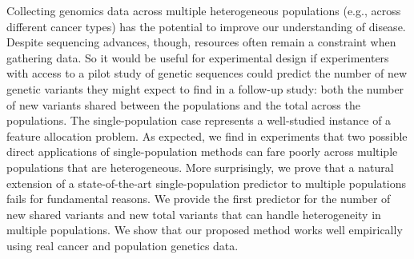 Collecting genomics data across multiple heterogeneous populations (e.g., across different cancer types) has the potential to improve our understanding of disease. Despite sequencing advances, though, resources often remain a constraint when gathering data. So it would be useful for experimental design if experimenters with access to a pilot study of genetic sequences could predict the number of new genetic variants they might expect to find in a follow-up study: both the number of new variants shared between the populations and the total across the populations.  The single-population case represents a well-studied instance of a feature allocation problem. {As expected, we find in experiments that two possible direct applications of single-population methods can fare poorly across multiple populations that are heterogeneous. More surprisingly, we prove that a natural extension of a state-of-the-art single-population predictor to multiple populations fails for fundamental reasons.} We provide the first predictor for the number of new shared variants and new total variants that can handle heterogeneity in multiple populations. We show that our proposed method works well empirically using real cancer and population genetics data.
